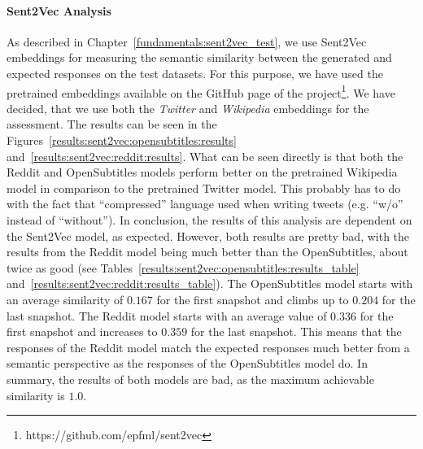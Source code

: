 \paragraph{Sent2Vec Analysis} As described in Chapter~\ref{fundamentals:sent2vec_test}, we use Sent2Vec embeddings for measuring the semantic similarity between the generated and expected responses on the test datasets. For this purpose, we have used the pretrained embeddings available on the GitHub page of the project\footnote{https://github.com/epfml/sent2vec}. We have decided, that we use both the \emph{Twitter} and \emph{Wikipedia} embeddings for the assessment. The results can be seen in the Figures~\ref{results:sent2vec:opensubtitles:results} and~\ref{results:sent2vec:reddit:results}. What can be seen directly is that both the Reddit and OpenSubtitles models perform better on the pretrained Wikipedia model in comparison to the pretrained Twitter model. This probably has to do with the fact that ``compressed'' language used when writing tweets (e.g. ``w/o'' instead of ``without''). In conclusion, the results of this analysis are dependent on the Sent2Vec model, as expected. However, both results are pretty bad, with the results from the Reddit model being much better than the OpenSubtitles, about twice as good (see Tables~\ref{results:sent2vec:opensubtitles:results_table} and~\ref{results:sent2vec:reddit:results_table}). The OpenSubtitles model starts with an average similarity of $0.167$ for the first snapshot and climbs up to $0.204$ for the last snapshot. The Reddit model starts with an average value of $0.336$ for the first snapshot and increases to $0.359$ for the last snapshot. This means that the responses of the Reddit model match the expected responses much better from a semantic perspective as the responses of the OpenSubtitles model do. In summary, the results of both models are bad, as the maximum achievable similarity is $1.0$.

